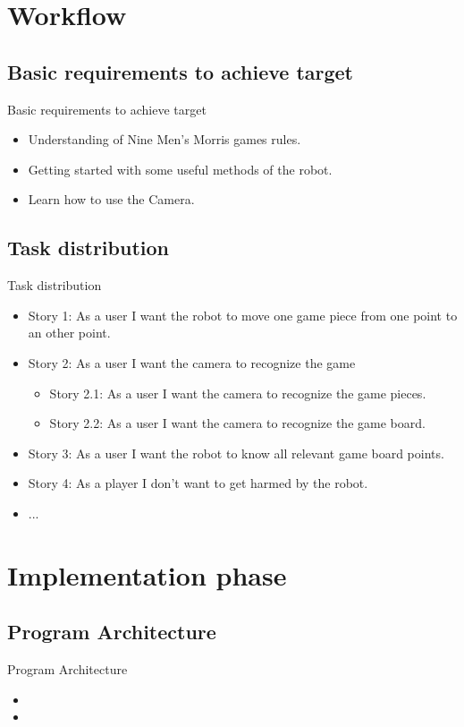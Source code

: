 \documentclass{beamer}
\begin{document}
\section{Workflow}
\subsection{Basic requirements to achieve target}
\begin{frame}{Basic requirements to achieve target}
\begin{itemize}
\item Understanding of Nine Men's Morris games rules.
\item Getting started with some useful methods of the robot.
\item Learn how to use the Camera. 
\end{itemize}
\end{frame}


\subsection{Task distribution}
\begin{frame}{Task distribution}
\begin{itemize}
\item Story 1: As a user I want the robot to move one game piece from one point to an other point.
\item Story 2: As a user I want the camera to recognize the game
\begin{itemize}
\item Story 2.1: As a user I want the camera to recognize the game pieces.
\item Story 2.2: As a user I want the camera to recognize the game board.
\end{itemize}
\item Story 3: As a user I want the robot to know all relevant game board points.
\item Story 4: As a player I don't want to get harmed by the robot.
\item ...
\end{itemize}
\end{frame}



\section{Implementation phase}
\subsection{Program Architecture}
\begin{frame}{Program Architecture}
\begin{itemize}
\item 
\item 
\end{itemize}
\end{frame}
\end{document}
